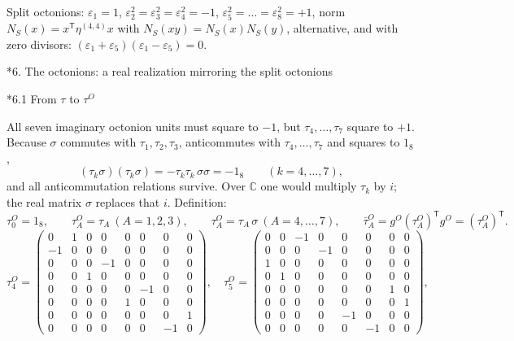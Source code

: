 \documentclass[10pt,a4paper]{article}
\makeatletter
\renewcommand\section{\@startsection{section}{1}{\z@}{-3.5ex \@plus -1ex \@minus -.2ex}{2.3ex \@plus.2ex}{\normalfont\Large\bfseries\raggedright}}
\renewcommand\subsection{\@startsection{subsection}{2}{\z@}{-3.25ex\@plus -1ex \@minus -.2ex}{1.5ex \@plus .2ex}{\normalfont\large\bfseries\raggedright}}
\makeatother
\begin{document}
Split octonions: $\varepsilon_1=1$, $\varepsilon_2^2=\varepsilon_3^2=\varepsilon_4^2=-1$, $\varepsilon_5^2=\dots=\varepsilon_8^2=+1$, norm $N_S(x)=x^{\mathsf T}\eta^{(4,4)}x$ with $N_S(xy)=N_S(x)N_S(y)$, alternative, and with zero divisors: $(\varepsilon_1+\varepsilon_5)(\varepsilon_1-\varepsilon_5)=0$.

\section*{6. The octonions: a real realization mirroring the split octonions}
\subsection*{6.1 From \texorpdfstring{$\tau$}{τ} to \texorpdfstring{$\tau^{O}$}{τO}}
All seven imaginary octonion units must square to $-1$, but $\tau_4,\dots,\tau_7$ square to $+1$. Because $\sigma$ commutes with $\tau_1,\tau_2,\tau_3$, anticommutes with $\tau_4,\dots,\tau_7$ and squares to $1_8$,
\begin{equation*}
(\tau_k\sigma)(\tau_k\sigma)=-\tau_k\tau_k\,\sigma\sigma=-1_8\qquad(k=4,\dots,7),
\end{equation*}
and all anticommutation relations survive. Over $\mathbb C$ one would multiply $\tau_k$ by $i$; the real matrix $\sigma$ replaces that $i$. Definition:
\begin{equation*}
\tau^{O}_0=1_8,\qquad \tau^{O}_A=\tau_A\ (A=1,2,3),\qquad \tau^{O}_A=\tau_A\,\sigma\ (A=4,\dots,7),\qquad \bar\tau^{O}_A=g^{O}(\tau^{O}_A)^{\mathsf T}g^{O}=(\tau^{O}_A)^{\mathsf T}.
\end{equation*}
\begin{equation*}
\tau^{O}_4=\begin{pmatrix}0 & 1 & 0 & 0 & 0 & 0 & 0 & 0 \\ -1 & 0 & 0 & 0 & 0 & 0 & 0 & 0 \\ 0 & 0 & 0 & -1 & 0 & 0 & 0 & 0 \\ 0 & 0 & 1 & 0 & 0 & 0 & 0 & 0 \\ 0 & 0 & 0 & 0 & 0 & -1 & 0 & 0 \\ 0 & 0 & 0 & 0 & 1 & 0 & 0 & 0 \\ 0 & 0 & 0 & 0 & 0 & 0 & 0 & 1 \\ 0 & 0 & 0 & 0 & 0 & 0 & -1 & 0\end{pmatrix},\quad \tau^{O}_5=\begin{pmatrix}0 & 0 & -1 & 0 & 0 & 0 & 0 & 0 \\ 0 & 0 & 0 & -1 & 0 & 0 & 0 & 0 \\ 1 & 0 & 0 & 0 & 0 & 0 & 0 & 0 \\ 0 & 1 & 0 & 0 & 0 & 0 & 0 & 0 \\ 0 & 0 & 0 & 0 & 0 & 0 & 1 & 0 \\ 0 & 0 & 0 & 0 & 0 & 0 & 0 & 1 \\ 0 & 0 & 0 & 0 & -1 & 0 & 0 & 0 \\ 0 & 0 & 0 & 0 & 0 & -1 & 0 & 0\end{pmatrix},
\end{equation*}
\end{document}
